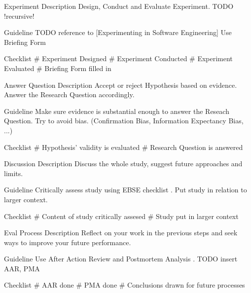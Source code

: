 	
Experiment	
	Description
		Design, Conduct and Evaluate Experiment.
		TODO !recursive!
	
	Guideline
		TODO reference to [Experimenting in Software Engineering]
		Use Briefing Form
		
	Checklist
		\# Experiment Designed
		\# Experiment Conducted
		\# Experiment Evaluated
		\# Briefing Form filled in
		

Answer Question
	Description
		Accept or reject Hypothesis based on evidence.
		Answer the Research Question accordingly.
	
	Guideline
		Make sure evidence is substantial enough to answer the Reseach Question.
		Try to avoid bias. (Confirmation Bias, Information Expectancy Bias, ...)
		
	Checklist
		\# Hypothesis' validity is evaluated
		\# Research Question is answered
	
	
Discussion
	Description
		Discuss the whole study, suggest future approaches and limits.
		
	Guideline
		Critically assess study using EBSE checklist \cite[p. 62]{Dyba2005}.
		Put study in relation to larger context.

	Checklist
		\# Content of study critically assesed
		\# Study put in larger context


Eval Process
	Description
		Reflect on your work in the previous steps and seek ways to improve your
		future performance.
		
	Guideline	
		Use After Action Review and Postmortem Analysis \cite{Dyba2005}.
		TODO insert AAR, PMA
		
	Checklist	
		\# AAR done
		\# PMA done
		\# Conclusions drawn for future processes
	
		
	
	